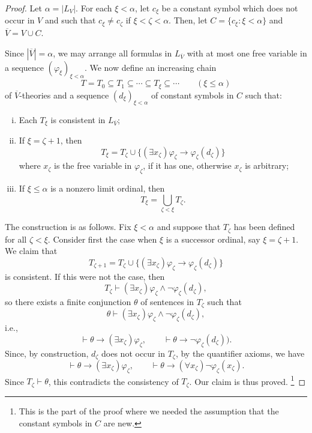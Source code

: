 \documentclass{scrartcl}
\renewcommand{\phi}{\varphi}
\begin{document}
\begin{proof}

Let $\alpha = |L_V|$. For each $\xi<\alpha$, let $c_\xi$ be a constant symbol which does not occur in $V$ and such that $c_\xi\not =c_\zeta$ if $\xi<\zeta<\alpha$. Then, let $C=\{c_\xi\colon \xi<\alpha\}$ and $\overline{V} = V\cup C$.

Since $|\overline{V}| = \alpha$, we may arrange all formulas in $L_{\overline{V}}$ with at most one free variable in a sequence $(\phi_{\xi})_{\xi<\alpha}$. We now define an increasing chain 
\[
T=T_0\subseteq T_1\subseteq \cdots\subseteq T_\xi\subseteq\cdots\qquad (\xi\leq\alpha)
\]
of $\overline{V}$-theories and a sequence $(d_{\xi})_{\xi<\alpha}$ of constant symbols in $C$ such that:
\begin{enumerate}[i)]
\item Each $T_\xi$ is consistent in $L_{\overline{V}}$;
\item If $\xi = \zeta +1$, then 
\[
T_\xi = T_\zeta \cup \{ (\exists x_\zeta)\phi_\zeta\rightarrow \phi_\zeta(d_\zeta)\}
\]
where $x_\zeta$ is the free variable in $\phi_\zeta$, if it has one, otherwise $x_\zeta$ is arbitrary;
\item If $\xi\le\alpha$ is a nonzero limit ordinal, then
\[
T_\xi = \bigcup_{\zeta <\xi}T_\zeta\text{.}
\]
\end{enumerate}

The construction is as follows. Fix $\xi<\alpha$ and suppose that $T_\zeta$ has been defined for all $\zeta<\xi$. Consider first the case when $\xi$ is a successor ordinal, say $\xi=\zeta+1$. We claim that 
\[
T_{\zeta +1} = T_\zeta \cup \{ (\exists x_\zeta)\phi_\zeta\rightarrow \phi_\zeta(d_\zeta)\}
\]
is consistent. If this were not the case, then 
\[
T_\zeta \vdash (\exists x_\zeta)\phi_\zeta\wedge \neg\phi_\zeta(d_\zeta),
\]
so there exists a finite conjunction $\theta$ of sentences in $T_\zeta$ such that
\[
\theta \vdash (\exists x_\zeta)\phi_\zeta\wedge \neg\phi_\zeta(d_\zeta),
\]
i.e., 
\[
 \vdash \theta \to(\exists x_\zeta)\phi_\zeta,
 \qquad 
 \vdash \theta \to \neg\phi_\zeta(d_\zeta)).
\]
Since, by construction, $d_\zeta$ does not occur in $T_\zeta$, by the quantifier axioms, we have
\[
 \vdash \theta \to(\exists x_\zeta)\phi_\zeta,
 \qquad 
 \vdash \theta \to (\forall x_\zeta)\neg\phi_\zeta(x_\zeta).
\]
Since $T_\zeta\vdash\theta$, this contradicts the consistency of $T_\zeta$. Our claim is thus proved.%
\footnote{This is the part of the proof where we needed the assumption that the constant symbols in $C$ are new.}


\end{proof}
\end{document}
